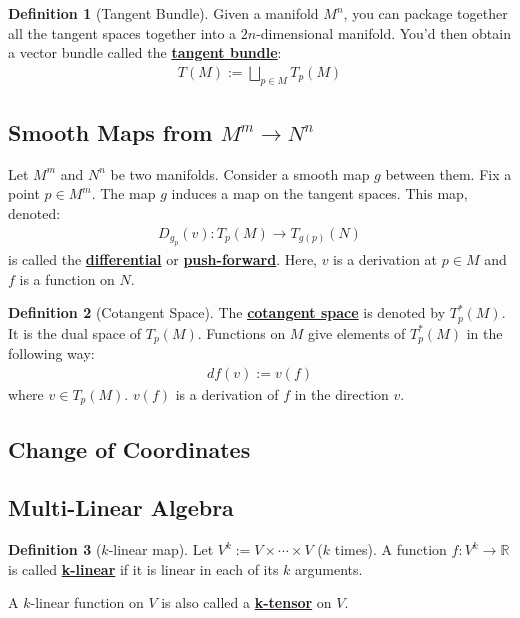 \documentclass[11pt]{scrartcl}
\newcommand{\R}[0]{\mathbb{R}}
\theoremstyle{definition}
\newtheorem{definition}{Definition}
\theoremstyle{remark}
\newcommand{\dfn}[1]{\textbf{\underline{#1}}}
\begin{document}
{\begin{definition}[Tangent Bundle]
	Given a manifold $M^n$, you can package together all the tangent spaces together into a $2n$-dimensional manifold. You'd then obtain a vector bundle called the \dfn{tangent bundle}: 
	\begin{align*}
		T(M) := \bigsqcup_{p \in M} T_p(M) 
	\end{align*}
\end{definition}

\subsection{Smooth Maps from $M^m \rightarrow N^n$}
Let $M^m$ and $N^n$ be two manifolds. Consider a smooth map $g$ between them. Fix a point $p \in M^m$. The map $g$ induces a map on the tangent spaces. This map, denoted: 
\begin{align*}
	 D_{g_p}(v): T_p(M) \rightarrow T_{g(p)}(N)
\end{align*}
	is called the \dfn{differential} or \dfn{push-forward}. Here, $v$ is a derivation at $p \in M$ and $f$ is a function on $N$. 


\begin{definition}[Cotangent Space]
	The \dfn{cotangent space} is denoted by $T^*_p(M)$. It is the dual space of $T_p(M)$. Functions on $M$ give elements of $T_p^*(M)$ in the following way: 
	\begin{align*}
		df(v) := v(f) 
	\end{align*}
	where $v \in T_p(M)$. $v(f)$ is a derivation of $f$ in the direction $v$. 
\end{definition}
\subsection{Change of Coordinates}

\subsection{Multi-Linear Algebra}
\begin{definition}[$k$-linear map]
	Let $V^k := V \times \cdots \times V$ ($k$ times). A function $f:V^k \rightarrow \R$ is called \dfn{k-linear} if it is linear in each of its $k$ arguments. 
\end{definition}
A $k$-linear function on $V$ is also called a \dfn{k-tensor} on $V$. 

}
\end{document}
